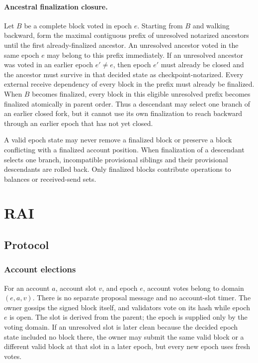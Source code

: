\documentclass[10pt,twocolumn]{article}
\begin{document}
\paragraph{Ancestral finalization closure.} Let $B$ be a complete block voted in epoch $e$. Starting from $B$ and walking backward, form the maximal contiguous prefix of unresolved notarized ancestors until the first already-finalized ancestor. An unresolved ancestor voted in the same epoch $e$ may belong to this prefix immediately. If an unresolved ancestor was voted in an earlier epoch $e'\ne e$, then epoch $e'$ must already be closed and the ancestor must survive in that decided state as checkpoint-notarized. Every external receive dependency of every block in the prefix must already be finalized. When $B$ becomes finalized, every block in this eligible unresolved prefix becomes finalized atomically in parent order. Thus a descendant may select one branch of an earlier closed fork, but it cannot use its own finalization to reach backward through an earlier epoch that has not yet closed.

A valid epoch state may never remove a finalized block or preserve a block conflicting with a finalized account position. When finalization of a descendant selects one branch, incompatible provisional siblings and their provisional descendants are rolled back. Only finalized blocks contribute operations to balances or received-send sets.

\section{RAI}
\subsection{Protocol}
\subsubsection{Account elections}
For an account $a$, account slot $v$, and epoch $e$, account votes belong to domain $(e,a,v)$. There is no separate proposal message and no account-slot timer. The owner gossips the signed block itself, and validators vote on its hash while epoch $e$ is open. The slot is derived from the parent; the epoch is supplied only by the voting domain. If an unresolved slot is later clean because the decided epoch state included no block there, the owner may submit the same valid block or a different valid block at that slot in a later epoch, but every new epoch uses fresh votes.
\end{document}

